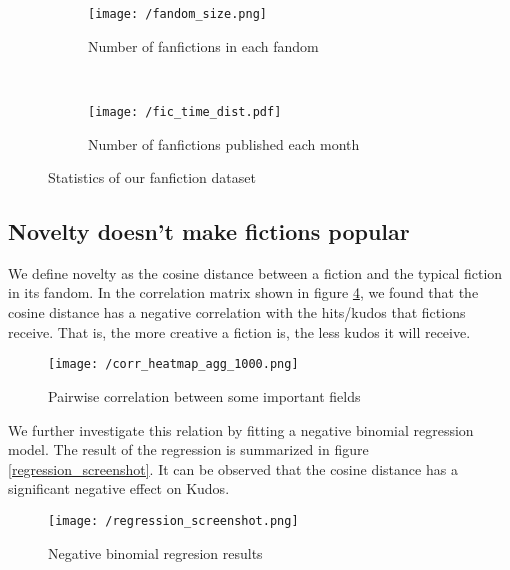 \documentclass[a4paper]{article}
\begin{document}
\begin{figure}
    \centering
    \begin{subfigure}[b]{0.4\textwidth}
        \texttt{[image: /fandom\_size.png]}
        \caption{Number of fanfictions in each fandom}
        \label{fig:fandom_size}
    \end{subfigure}
    ~ %
    \begin{subfigure}[b]{0.4\textwidth}
        \texttt{[image: /fic\_time\_dist.pdf]}
        \caption{Number of fanfictions published each month}
        \label{fig:fic_time_dist}
    \end{subfigure}
    \caption{Statistics of our fanfiction dataset}\label{fig:animals}
\end{figure}



\label{sec:results}
\subsection{Novelty doesn't make fictions popular}
We define novelty as the cosine distance between a fiction and the typical fiction in its fandom. In the correlation matrix shown in figure \ref{fig:corr_heatmap}, we found that the cosine distance has a negative correlation with the hits/kudos that fictions receive. That is, the more creative a fiction is, the less kudos it will receive.

\begin{figure}[htbp]
\begin{center}
\texttt{[image: /corr\_heatmap\_agg\_1000.png]}
\caption{Pairwise correlation between some important fields }
\label{fig:corr_heatmap}
\end{center}
\end{figure}

We further investigate this relation by fitting a negative binomial regression model. The result of the regression is summarized in figure \ref{regression_screenshot}. It can be observed that the cosine distance has a significant negative effect on Kudos.

\begin{figure}[htbp]
\begin{center}
\texttt{[image: /regression\_screenshot.png]}
\caption{Negative binomial regresion results}
\label{fig:regression}
\end{center}
\end{figure}
\end{document}
